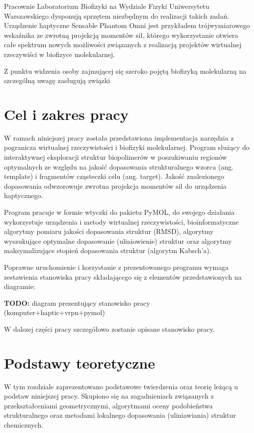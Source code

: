 \documentclass[licencjacka]{pracamgr}
\begin{document}
Pracownie Laboratorium Biofizyki na Wydziale Fizyki Uniwersytetu Warszawskiego dysponują sprzętem niezbędnym do realizacji takich zadań. Urządzenie haptyczne Sensable Phantom Omni jest przykładem trójwymiarowego wskaźnika ze zwrotną projekcją momentów sił, którego wykorzystanie otwiera całe spektrum nowych możliwości związanych z realizacją projektów wirtualnej rzeczywiści w biofizyce molekularnej. 
	
Z punktu widzenia osoby zajmującej się szeroko pojętą biofizyką molekularną na szczególną uwagę zasługują związki

\chapter*{Cel i zakres pracy}

W ramach niniejszej pracy została przedstawiona implementacja narzędzia z pogranicza wirtualnej rzeczywistości i biofizyki molekularnej. Program służący do interaktywnej eksploracji struktur biopolimerów w poszukiwaniu regionów optymalnych ze względu na jakość dopasowania strukturalnego wzorca (ang. template) i fragmentów cząsteczki celu (ang. target). Jakość znalezionego dopasowania odwzorowuje zwrotna projekcja momentów sił do urządzenia haptycznego. 
	
Program pracuje w formie wtyczki do pakietu PyMOL, do swojego działania wykorzystuje urządzenia i metody wirtualnej rzeczywistości, bioinformatyczne algorytmy pomiaru jakości dopasowania struktur (RMSD), algorytmy wyszukujące optymalne dopasowanie (uliniowienie) struktur oraz algorytmy maksymalizujące stopień dopasowania struktur (algorytm Kabsch'a).

Poprawne uruchomienie i korzystanie z prezentowanego programu wymaga zestawienia stanowiska pracy składającego się z elementów przedstawionych na diagramie:
	
\textbf{TODO:} diagram prezentujący stanowisko pracy (komputer+haptic+vrpn+pymol)

W dalszej części pracy szczegółowo zostanie opisane stanowisko pracy.

\chapter{Podstawy teoretyczne}
W tym rozdziale zaprezentowano podstawowe twierdzenia oraz teorię leżącą u podstaw niniejszej pracy. Skupiono się na zagadnieniach związanych z przekształceniami geometrycznymi, algorytmami oceny podobieństwa strukturalnego oraz metodami lokalnego dopasowania (uliniawiania) struktur chemicznych.
\end{document}
